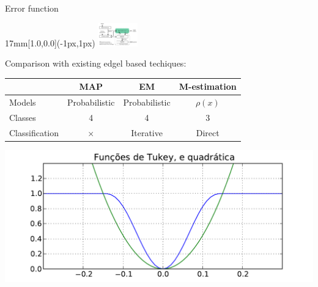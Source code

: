 \begin{frame}{Error function}
  \begin{textblock*}{17mm}[1.0,0.0](\paperwidth-1px,1px)
    \includegraphics[width=17mm]{blocos_s3.png}
  \end{textblock*}
  Comparison with existing edgel based techiques:

  {\footnotesize
    \begin{tabularx}{\textwidth}{lCCC}
      \toprule
      & MAP & EM & M-estimation\\
      \hline
      Models & Probabilistic & Probabilistic & $\rho(x)$ \\
      Classes & 4 & 4 & 3\\ 
      Classification & $\times$ & Iterative & Direct\\
      \bottomrule
    \end{tabularx}
  }
  
  \hspace{-0.25\baselineskip}\centerline{
    \includegraphics[height=7\baselineskip]{tukey.pdf}
  }
\end{frame}





